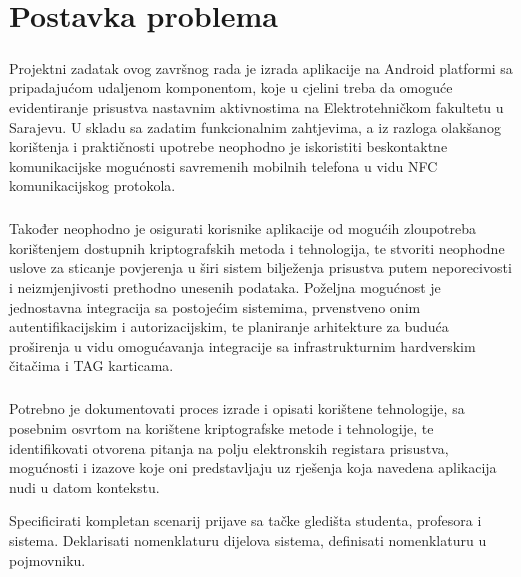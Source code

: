 \chapter{Postavka problema}
\paragraph*{}
Projektni zadatak ovog završnog rada je izrada aplikacije na Android platformi sa pripadajućom udaljenom komponentom, koje u cjelini treba da omoguće evidentiranje prisustva nastavnim aktivnostima na Elektrotehničkom fakultetu u Sarajevu. U skladu sa zadatim funkcionalnim zahtjevima, a iz razloga olakšanog korištenja i praktičnosti upotrebe neophodno je iskoristiti beskontaktne komunikacijske mogućnosti savremenih mobilnih telefona u vidu NFC komunikacijskog protokola.
\paragraph*{}
Također neophodno je osigurati korisnike aplikacije od mogućih zloupotreba korištenjem dostupnih kriptografskih metoda i tehnologija, te stvoriti neophodne uslove za sticanje povjerenja u širi sistem bilježenja prisustva putem neporecivosti i neizmjenjivosti prethodno unesenih podataka. Poželjna mogućnost je jednostavna integracija sa postojećim sistemima, prvenstveno onim autentifikacijskim i autorizacijskim, te planiranje arhitekture za buduća proširenja u vidu omogućavanja integracije sa infrastrukturnim hardverskim čitačima i TAG karticama.
\paragraph*{}
Potrebno je dokumentovati proces izrade i opisati korištene tehnologije, sa posebnim osvrtom na korištene kriptografske metode i tehnologije, te identifikovati otvorena pitanja na polju elektronskih registara prisustva, mogućnosti i izazove koje oni predstavljaju uz rješenja koja navedena aplikacija nudi u datom kontekstu.

Specificirati kompletan scenarij prijave sa tačke gledišta studenta, profesora i sistema. Deklarisati nomenklaturu dijelova sistema, definisati nomenklaturu u pojmovniku.